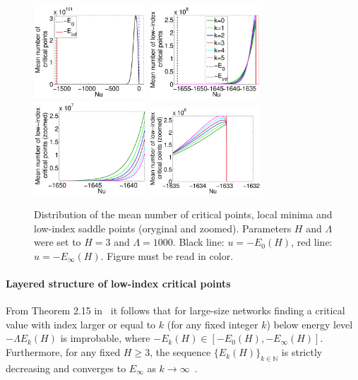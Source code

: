 \documentclass[twoside]{article}
\begin{document}
\begin{figure}[htp!]
  \center
\includegraphics[width = 1.65in]{Distr_cp.pdf}
\includegraphics[width = 1.65in]{Distr_lm_sp_li.pdf} 
\includegraphics[width = 1.65in]{Distr_lm_sp_li_zoomed_left.pdf} 
\includegraphics[width = 1.65in]{Distr_lm_sp_li_zoomed_right.pdf} 
\vspace{-0.3in}
\caption{Distribution of the mean number of critical points, local minima and low-index saddle points (oryginal and zoomed). Parameters $H$ and $\Lambda$ were set to $H = 3$ and $\Lambda = 1000$. Black line: $u = -E_0(H)$, red line: $u = -E_{\infty}(H)$. Figure must be read in color.}
\label{fig:Distr_cp_lm_sp}
\vspace{-0.1in}
\end{figure}

\paragraph{Layered structure of low-index critical points}
From Theorem 2.15 in~\cite{AAC2010} it follows that for large-size networks finding a critical value with index larger or equal to $k$ (for any fixed integer $k$) below energy level $-\Lambda E_k(H)$ is improbable, where $-E_k(H) \in [-E_0(H),-E_{\infty}(H)]$. Furthermore, for any fixed $H \geq 3$, the sequence $\{E_k(H)\}_{k\in\mathbb{N}}$ is strictly decreasing and converges to $E_{\infty}$ as $k \rightarrow \infty$~\cite{AAC2010}. 
\end{document}
